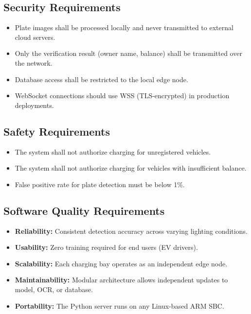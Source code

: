 \subsection{Security Requirements}
\begin{itemize}
    \item Plate images shall be processed locally and never transmitted to external cloud servers.
    \item Only the verification result (owner name, balance) shall be transmitted over the network.
    \item Database access shall be restricted to the local edge node.
    \item WebSocket connections should use WSS (TLS-encrypted) in production deployments.
\end{itemize}

\subsection{Safety Requirements}
\begin{itemize}
    \item The system shall not authorize charging for unregistered vehicles.
    \item The system shall not authorize charging for vehicles with insufficient balance.
    \item False positive rate for plate detection must be below 1\%.
\end{itemize}

\subsection{Software Quality Requirements}
\begin{itemize}
    \item \textbf{Reliability:} Consistent detection accuracy across varying lighting conditions.
    \item \textbf{Usability:} Zero training required for end users (EV drivers).
    \item \textbf{Scalability:} Each charging bay operates as an independent edge node.
    \item \textbf{Maintainability:} Modular architecture allows independent updates to model, OCR, or database.
    \item \textbf{Portability:} The Python server runs on any Linux-based ARM SBC.
\end{itemize}
